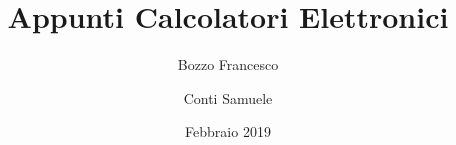 \documentclass[a4paper,12pt]{book}
\begin{document}
\author{Bozzo Francesco \and Conti Samuele}
\title{Appunti Calcolatori Elettronici}
\date{Febbraio 2019}

\frontmatter
\maketitle
\tableofcontents

\mainmatter



\backmatter
\end{document}
